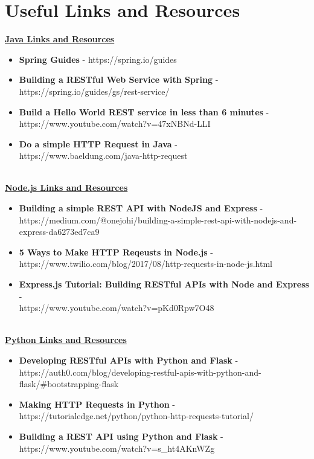 \documentclass{article}
\begin{document}

\section*{Useful Links and Resources} %

\textbf{\underline{Java Links and Resources}}
	\begin{itemize} 
	\item \textbf{Spring Guides} - https://spring.io/guides
	\item \textbf{Building a RESTful Web Service with Spring} - https://spring.io/guides/gs/rest-service/
	\item \textbf{Build a Hello World REST service in less than 6 minutes} - \\ https://www.youtube.com/watch?v=47xNBNd-LLI
	\item \textbf{Do a simple HTTP Request in Java} - \\ https://www.baeldung.com/java-http-request
\end{itemize}

\-\ \\
\textbf{\underline{Node.js Links and Resources}}
\begin{itemize} 
	\item \textbf{Building a simple REST API with NodeJS and Express} - \\ https://medium.com/@onejohi/building-a-simple-rest-api-with-nodejs-and-express-da6273ed7ca9
	\item \textbf{5 Ways to Make HTTP Reqeusts in Node.js} - \\ https://www.twilio.com/blog/2017/08/http-requests-in-node-js.html
	\item \textbf{Express.js Tutorial:  Building RESTful APIs with Node and Express} - \\https://www.youtube.com/watch?v=pKd0Rpw7O48
\end{itemize}

\-\ \\
\textbf{\underline{Python Links and Resources}}
\begin{itemize} 
	\item \textbf{Developing RESTful APIs with Python and Flask} - \\ https://auth0.com/blog/developing-restful-apis-with-python-and-flask/\#bootstrapping-flask
	\item \textbf{Making HTTP Requests in Python} - https://tutorialedge.net/python/python-http-requests-tutorial/
	\item \textbf{Building a REST API using Python and Flask} - https://www.youtube.com/watch?v=s\_ht4AKnWZg
\end{itemize}	
\end{document}
